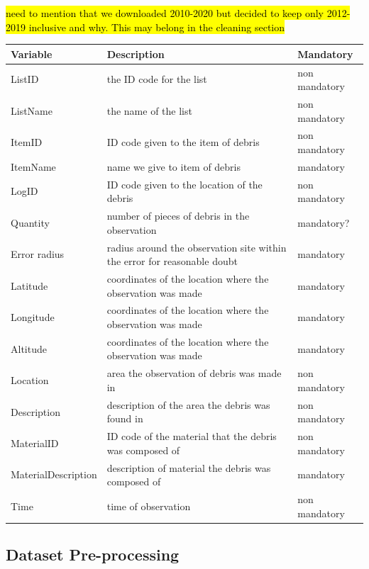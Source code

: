 \documentclass[10pt]{article}\usepackage[]{graphicx}\usepackage[]{color}
\begin{document}
\hl{need to mention that we downloaded 2010-2020 but decided to keep only 2012-2019 inclusive and why. This may belong in the cleaning section}

\begin{table}[H]
\begin{tabular}{ l l l }
Variable & Description & Mandatory \\
\hline
ListID  & the ID code for the list & non mandatory \\
ListName & the name of the list & non mandatory \\
ItemID & ID code given to the item of debris & non mandatory \\
ItemName & name we give to item of debris & mandatory \\
LogID &  ID code given to the location of the debris & non mandatory \\
Quantity & number of pieces of debris in the observation & mandatory? \\
Error radius & radius around the observation site within the error for reasonable doubt & mandatory \\
Latitude & coordinates of the location where the observation was made & mandatory \\
Longitude & coordinates of the location where the observation was made & mandatory \\
Altitude & coordinates of the location where the observation was made & mandatory \\
Location & area the observation of debris was made in & non mandatory \\
Description & description of the area the debris was found in & non mandatory \\
MaterialID & ID code of the material that the debris was composed of & non mandatory \\
MaterialDescription & description of material the debris was composed of & mandatory\\ 
Time & time of observation & non mandatory \\
\end{tabular}
\end{table}

\subsection{Dataset Pre-processing}
\end{document}
